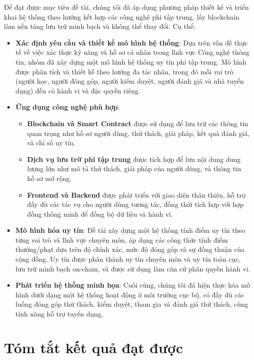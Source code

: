 Để đạt được mục tiêu đề tài, chúng tôi đã áp dụng phương pháp thiết kế và triển khai hệ thống theo hướng kết hợp các công nghệ phi tập trung, lấy blockchain làm nền tảng lưu trữ minh bạch và không thể thay đổi. Cụ thể:
\begin{itemize}
  \item \textbf{Xác định yêu cầu và thiết kế mô hình hệ thống}: Dựa trên vấn đề thực tế về việc xác thực kỹ năng và hồ sơ cá nhân trong lĩnh vực Công nghệ thông tin, nhóm đã xây dựng một mô hình hệ thống uy tín phi tập trung.
        Mô hình được phân tích và thiết kế theo hướng đa tác nhân, trong đó mỗi vai trò (người học, người đóng góp, người kiểm duyệt, người đánh giá và nhà tuyển dụng) đều có hành vi và đặc quyền riêng.
  \item \textbf{Ứng dụng công nghệ phù hợp}:
        \begin{itemize}
          \item \textbf{Blockchain và Smart Contract} được sử dụng để lưu trữ các thông tin quan trọng như hồ sơ người dùng, thử thách, giải pháp, kết quả đánh giá, và chỉ số uy tín.
          \item \textbf{Dịch vụ lưu trữ phi tập trung} được tích hợp để lưu nội dung dung lượng lớn như mô tả thử thách, giải pháp của người dùng, và thông tin hồ sơ mở rộng.
          \item \textbf{Frontend và Backend} được phát triển với giao diện thân thiện, hỗ trợ đầy đủ các tác vụ cho người dùng tương tác, đồng thời tích hợp với hợp đồng thông minh để đồng bộ dữ liệu và hành vi.
        \end{itemize}
  \item \textbf{Mô hình hóa uy tín}: Đề tài xây dựng một hệ thống tính điểm uy tín theo từng vai trò và lĩnh vực chuyên môn, áp dụng các công thức tính điểm thưởng/phạt dựa trên độ chính xác, mức độ đóng góp và sự đồng thuận của cộng đồng. Uy tín được phân thành uy tín chuyên môn và uy tín toàn cục, lưu trữ minh bạch on-chain, và được sử dụng làm căn cứ phân quyền hành vi.
  \item \textbf{Phát triển hệ thống minh họa}: Cuối cùng, chúng tôi đã hiện thực hóa mô hình dưới dạng một hệ thống hoạt động ở môi trường cục bộ, có đầy đủ các luồng đóng góp thử thách, kiểm duyệt, tham gia và đánh giá thử thách, cùng tính năng hỗ trợ tuyển dụng.
\end{itemize}

\section{Tóm tắt kết quả đạt được}

